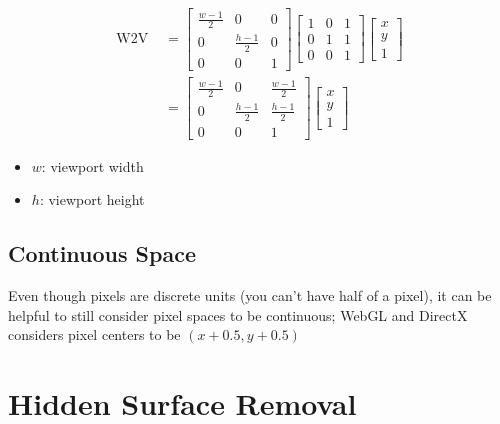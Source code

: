   \begin{align}
    \text{W2V } &=
    \begin{bmatrix}
      \frac{w - 1}{2} & 0 & 0 \\
      0 & \frac{h - 1}{2} & 0 \\
      0 & 0 & 1
    \end{bmatrix}
    \begin{bmatrix}
      1 & 0 & 1 \\
      0 & 1 & 1 \\
      0 & 0 & 1
    \end{bmatrix}
    \begin{bmatrix}
      x \\
      y \\
      1
    \end{bmatrix} \\
    &=
    \begin{bmatrix}
      \frac{w - 1}{2} & 0 & \frac{w - 1}{2} \\
      0 & \frac{h - 1}{2} & \frac{h - 1}{2} \\
      0 & 0 & 1
    \end{bmatrix}
    \begin{bmatrix}
      x \\
      y \\
      1
    \end{bmatrix}
  \end{align}

  \begin{itemize}
    \item $ w $: viewport width
    \item $ h $: viewport height
  \end{itemize}

  \subsection{Continuous Space}

    Even though pixels are discrete units (you can't have half of a pixel),
    it can be helpful to still consider pixel spaces to be continuous; WebGL
    and DirectX considers pixel centers to be
    $ \left( x + 0.5, y + 0.5 \right) $

\section{Hidden Surface Removal}

